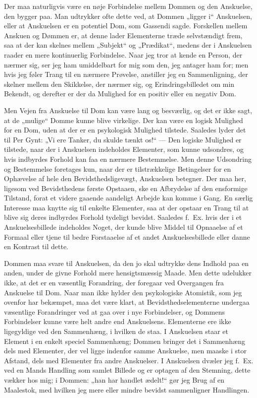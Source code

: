 \documentclass[12pt,a4paper]{book}
\newcommand{\apage}[1]{\marginnote{\footnotesize\textit{[#1]}}}
\begin{document}
Der maa naturligvis være en nøje Forbindelse mellem Dommen og den
Anskuelse, den bygger paa. Man udtrykker ofte dette ved, at Dommen
„ligger i“ Anskuelsen, eller at Anskuelsen er en potentiel Dom, som
Gassendi sagde. Forskellen mellem Anskuen og Dømmen er, at denne lader
Elementerne træde selvstændigt frem, saa at der kan skelnes mellem
„Subjekt“ og „Prædikat“, medens der i Anskuelsen raader en mere
kontinuerlig Forbindelse. Naar jeg tror at \apage{58} kende en Person, der nærmer
sig, ser jeg ham umiddelbart for mig som den, jeg antager ham for; men
hvis jeg føler Trang til en nærmere Prøvelse, anstiller jeg en
Sammenligning, der skelner mellem den Skikkelse, der nærmer sig, og
Erindringsbilledet om min Bekendt, og derefter er der da Mulighed for en
positiv eller en negativ Dom.

Men Vejen fra Anskuelse til Dom kan være lang og besværlig, og det er
ikke sagt, at de „mulige“ Domme kunne blive virkelige. Der kan være en
logisk Mulighed for en Dom, uden at der er en psykologisk Mulighed
tilstede. Saaledes lyder det til Per Gynt: „Vi ere Tanker, du skulde
tænkt os!“ --- Den logiske Mulighed er tilstede, naar der i Anskuelsen
indeholdes Elementer, som kunne udsondres, og hvis indbyrdes Forhold kan
faa en nærmere Bestemmelse. Men denne Udsondring og Bestemmelse
foretages kun, naar der er tilstrækkelige Betingelser for en Ophævelse af
hele den Bevidsthedsligevægt, Anskuelsen betegner. Der maa her, ligesom
ved Bevidsthedens første Opstaaen, ske en Afbrydelse af den ensformige
Tilstand, forat et videre gaaende aandeligt Arbejde kan komme i Gang. En
særlig Interesse maa knytte sig til enkelte Elementer, saa at der opstaar
en Trang til at blive sig deres indbyrdes Forhold tydeligt bevidst.
Saaledes f.\ Ex. hvis der i et Anskuelsesbillede indeholdes Noget, der
kunde blive Middel til Opnaaelse af et Formaal eller tjene til bedre
Forstaaelse af et andet Anskuelsesbillede eller danne en Kontrast til
dette.

Dommen maa svare til Anskuelsen, da den jo skal udtrykke dens Indhold paa
en anden, under de givne Forhold mere hensigtsmæssig Maade. Men dette
udelukker ikke, at det er en væsentlig Forandring, der foregaar ved
Overgangen fra Anskuelse til Dom. Naar man ikke hylder den psykologiske
Atomistik, som jeg ovenfor har bekæmpet, maa det være klart, at
Bevidsthedselementerne undergaa væsentlige Forandringer ved at gaa over i
nye Forbindelser, og Dommens Forbindelser kunne være helt andre end
Anskuelsens. Elementerne ere ikke ligegyldige ved den Sammenhæng, i
hvilken de staa. I Anskuelsen staar et Element i en \apage{59} enkelt speciel
Sammenhæng; Dommen bringer det i Sammenhæng dels med Elementer, der vel
ligge indenfor samme Anskuelse, men maaske i stor Afstand, dels med
Elementer fra andre Anskuelser. I Anskuelsen dvæler jeg f.\ Ex. ved en
Mands Handling som samlet Billede og er optagen af den Stemning, dette
vækker hos mig; i Dommen: „han har handlet ædelt!“ gør jeg Brug af en
Maalestok, med hvilken jeg mere eller mindre bevidst sammenligner
Handlingen.
\end{document}
